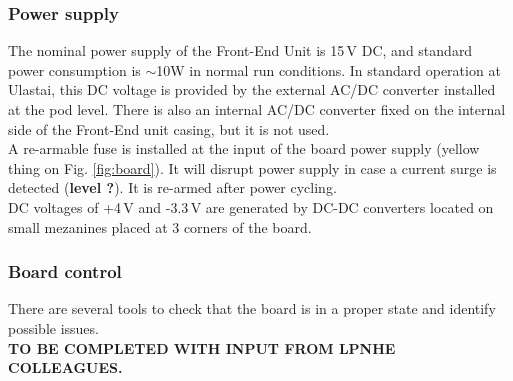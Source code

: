 \subsubsection{Power supply}
The nominal power supply of the Front-End Unit is 15\,V DC, and standard power consumption is $\sim$10W in normal run conditions. In standard operation at Ulastai, this DC voltage is provided by the external AC/DC converter installed at the pod level. There is also an internal AC/DC converter fixed on the internal side of the Front-End unit casing, but it is not used. \\
%
A re-armable fuse is installed at the input of the board power supply (yellow thing on Fig. \ref{fig:board}). It will disrupt power supply in case a current surge is detected ({\bf level ?}). It is re-armed after power cycling. \\
%
DC voltages of +4\,V and -3.3\,V are generated by DC-DC converters located on small mezanines placed at 3 corners of the board.

\subsubsection{Board control}
\label{control}
There are several tools to check that the board is in a proper state and identify possible issues. \\
%

 {\bf TO BE COMPLETED WITH INPUT FROM LPNHE COLLEAGUES.}

